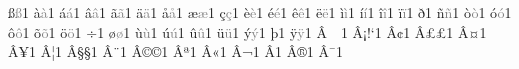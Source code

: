 \documentclass{article}
\begin{document}
{        {^^df}{{\textcolor{gray}{\ss}}}1  %
        {^^e0}{{\textcolor{gray}{\`{a}}}}1  %
        {^^e1}{{\textcolor{gray}{\'{a}}}}1  %
        {^^e2}{{\textcolor{gray}{\^{a}}}}1  %
        {^^e3}{{\textcolor{gray}{\~{a}}}}1  %
        {^^e4}{{\textcolor{gray}{\"{a}}}}1  %
        {^^e5}{{\textcolor{gray}{\aa}}}1  %
        {^^e6}{{\textcolor{gray}{\ae}}}1  %
        {^^e7}{{\textcolor{gray}{\c{c}}}}1  %
        {^^e8}{{\textcolor{gray}{\`{e}}}}1  %
        {^^e9}{{\textcolor{gray}{\'{e}}}}1  %
        {^^ea}{{\textcolor{gray}{\^{e}}}}1  %
        {^^eb}{{\textcolor{gray}{\"{e}}}}1  %
        {^^ec}{{\textcolor{gray}{\`{i}}}}1  %
        {^^ed}{{\textcolor{gray}{\'{i}}}}1  %
        {^^ee}{{\textcolor{gray}{\^{i}}}}1  %
        {^^ef}{{\textcolor{gray}{\"{i}}}}1  %
        {^^f0}{{\textcolor{gray}{\dh}}}1  %
        {^^f1}{{\textcolor{gray}{\~{n}}}}1  %
        {^^f2}{{\textcolor{gray}{\`{o}}}}1  %
        {^^f3}{{\textcolor{gray}{\'{o}}}}1  %
        {^^f4}{{\textcolor{gray}{\^{o}}}}1  %
        {^^f5}{{\textcolor{gray}{\~{o}}}}1  %
        {^^f6}{{\textcolor{gray}{\"{o}}}}1  %
        {^^f7}{{\textcolor{gray}{\textdiv}}}1  %
        {^^f8}{{\textcolor{gray}{\o}}}1  %
        {^^f9}{{\textcolor{gray}{\`{u}}}}1  %
        {^^fa}{{\textcolor{gray}{\'{u}}}}1  %
        {^^fb}{{\textcolor{gray}{\^{u}}}}1  %
        {^^fc}{{\textcolor{gray}{\"{u}}}}1  %
        {^^fd}{{\textcolor{gray}{\'{y}}}}1  %
        {^^fe}{{\textcolor{gray}{\th}}}1  %
        {^^ff}{{\textcolor{gray}{\"{y}}}}1  %
        {^^c2^^a0}{{~}}1  %
        {^^c2^^a1}{{!`}}1  %
        {^^c2^^a2}{{\textcent}}1  %
        {^^c2^^a3}{{\pounds}}1  %
        {^^c2^^a4}{{\textcurrency}}1  %
        {^^c2^^a5}{{\textyen}}1  %
        {^^c2^^a6}{{\textbrokenbar}}1  %
        {^^c2^^a7}{{\S}}1  %
        {^^c2^^a8}{{\textasciidieresis}}1  %
        {^^c2^^a9}{{\copyright}}1  %
        {^^c2^^aa}{{\textordfeminine}}1  %
        {^^c2^^ab}{{\guillemotleft}}1  %
        {^^c2^^ac}{{\textlnot}}1  %
        {^^c2^^ad}{{\-}}1  %
        {^^c2^^ae}{{\textregistered}}1  %
        {^^c2^^af}{{\textasciimacron}}1  %
}
\end{document}
